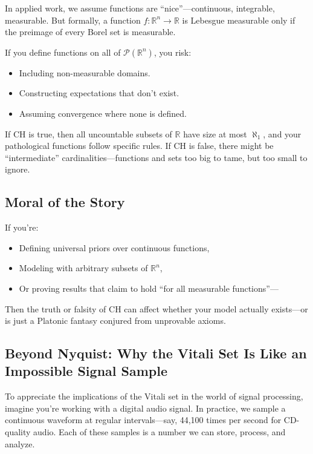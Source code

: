 In applied work, we assume functions are “nice”—continuous, integrable, measurable. But formally, a function \( f: \mathbb{R}^n \to \mathbb{R} \) is Lebesgue measurable only if the preimage of every Borel set is measurable.

If you define functions on all of \(\mathcal{P}(\mathbb{R}^n)\), you risk:
\begin{itemize}
  \item Including non-measurable domains.
  \item Constructing expectations that don’t exist.
  \item Assuming convergence where none is defined.
\end{itemize}

If CH is true, then all uncountable subsets of \(\mathbb{R}\) have size at most \(\aleph_1\), and your pathological functions follow specific rules. If CH is false, there might be “intermediate” cardinalities—functions and sets too big to tame, but too small to ignore.

\subsection*{Moral of the Story}

If you're:
\begin{itemize}
  \item Defining universal priors over continuous functions,
  \item Modeling with arbitrary subsets of \(\mathbb{R}^n\),
  \item Or proving results that claim to hold “for all measurable functions”—
\end{itemize}

\noindent Then the truth or falsity of CH can affect whether your model actually exists—or is just a Platonic fantasy conjured from unprovable axioms.

\subsection{Beyond Nyquist: Why the Vitali Set Is Like an Impossible Signal Sample}

To appreciate the implications of the Vitali set in the world of signal processing, imagine you're working with a digital audio signal. In practice, we sample a continuous waveform at regular intervals—say, 44,100 times per second for CD-quality audio. Each of these samples is a number we can store, process, and analyze.

